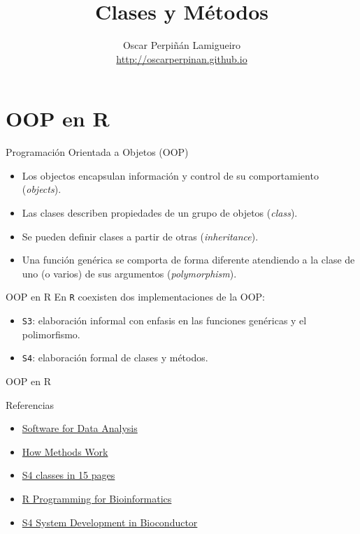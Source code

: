\documentclass[xcolor={usenames,svgnames,dvipsnames}]{beamer}
\author{Oscar Perpiñán Lamigueiro \\ \url{http://oscarperpinan.github.io}}
\date{}
\title{Clases y Métodos}
\begin{document}
\maketitle

\section{OOP en R}
\label{sec:orgb943055}

\begin{frame}[label={sec:org4ce3b73}]{Programación Orientada a Objetos (OOP)}
\begin{itemize}
\item Los objectos encapsulan información y control de su comportamiento (\emph{objects}).
\item Las clases describen propiedades de un grupo de objetos (\emph{class}).
\item Se pueden definir clases a partir de otras (\emph{inheritance}).
\item Una función genérica se comporta de forma diferente atendiendo a la
clase de uno (o varios) de sus argumentos (\emph{polymorphism}).
\end{itemize}
\end{frame}
\begin{frame}[label={sec:org4a30d99},fragile]{OOP en R}
 En \texttt{R} coexisten dos implementaciones de la OOP:
\begin{itemize}
\item \texttt{S3}: elaboración informal con enfasis en las funciones genéricas y el polimorfismo.
\item \texttt{S4}: elaboración formal de clases y métodos.
\end{itemize}
\end{frame}
\begin{frame}[label={sec:org6af5fc3}]{OOP en R}
\begin{block}{Referencias}
\begin{center}
\begin{itemize}
\item \href{http://www.springer.com/gb/book/9780387759357}{Software for Data Analysis}
\item \href{http://developer.r-project.org/howMethodsWork.pdf}{How Methods Work}
\item \href{http://www.stat.auckland.ac.nz/S-Workshop/Gentleman/S4Objects.pdf}{S4 classes in 15 pages}
\item \href{http://bioconductor.org/help/publications/books/r-programming-for-bioinformatics/}{R Programming for Bioinformatics }
\item \href{http://bioconductor.org/help/course-materials/2010/AdvancedR/S4InBioconductor.pdf}{S4 System Development in Bioconductor}
\end{itemize}
\end{center}
\end{block}
\end{frame}
\end{document}
